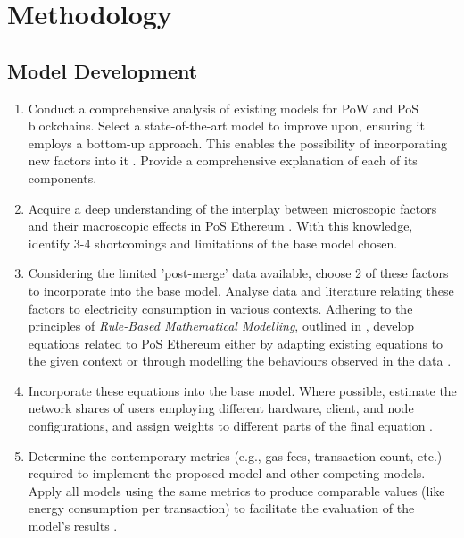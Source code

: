 \chapter {Methodology}

\section{Model Development}
\begin{enumerate}
    \item Conduct a comprehensive analysis of existing models for PoW and PoS blockchains. Select a state-of-the-art model to improve upon, ensuring it employs a bottom-up approach. This enables the possibility of incorporating new factors into it \cite{CambridgeCBECI}. Provide a comprehensive explanation of each of its components.

    \item Acquire a deep understanding of the interplay between microscopic factors and their macroscopic effects in PoS Ethereum \cite{MarionAnModelling}. With this knowledge, identify 3-4 shortcomings and limitations of the base model chosen.

    \item Considering the limited 'post-merge' data available, choose 2 of these factors to incorporate into the base model. Analyse data and literature relating these factors to electricity consumption in various contexts. Adhering to the principles of \textit{Rule-Based Mathematical Modelling}, outlined in , develop equations related to PoS Ethereum either by adapting existing equations to the given context or through modelling the behaviours observed in the data \cite{CryptoCarbonRatingsInstitute2022TheNetwork}.

    \item Incorporate these equations into the base model. Where possible, estimate the network shares of users employing different hardware, client, and node configurations, and assign weights to different parts of the final equation \cite{CCRI:Institute}.

    \item Determine the contemporary metrics (e.g., gas fees, transaction count, etc.) required to implement the proposed model and other competing models. Apply all models using the same metrics to produce comparable values (like energy consumption per transaction) to facilitate the evaluation of the model's results \cite{CryptoCarbonRatingsInstitute2022TheNetwork}.

\end{enumerate}

